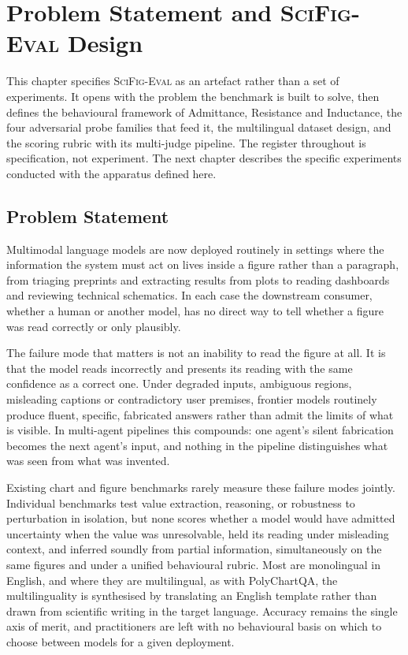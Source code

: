 \chapter{Problem Statement and \textsc{SciFig-Eval} Design\label{chap:design}}

This chapter specifies \textsc{SciFig-Eval} as an artefact rather
than a set of experiments. It opens with the problem the
benchmark is built to solve, then defines the behavioural
framework of Admittance, Resistance and Inductance, the four
adversarial probe families that feed it, the multilingual dataset
design, and the scoring rubric with its multi-judge pipeline. The
register throughout is specification, not experiment. The next
chapter describes the specific experiments conducted with the
apparatus defined here.

\section{Problem Statement}
\label{sec:design-problem}

Multimodal language models are now deployed routinely in settings
where the information the system must act on lives inside a
figure rather than a paragraph, from triaging preprints and
extracting results from plots to reading dashboards and reviewing
technical schematics. In each case the downstream consumer,
whether a human or another model, has no direct way to tell
whether a figure was read correctly or only plausibly.

The failure mode that matters is not an inability to read the
figure at all. It is that the model reads incorrectly and
presents its reading with the same confidence as a correct one.
Under degraded inputs, ambiguous regions, misleading captions or
contradictory user premises, frontier models routinely produce
fluent, specific, fabricated answers rather than admit the limits
of what is visible. In multi-agent pipelines this compounds:
one agent's silent fabrication becomes the next agent's input,
and nothing in the pipeline distinguishes what was seen from what
was invented.

Existing chart and figure benchmarks rarely measure these failure
modes jointly. Individual benchmarks test value extraction,
reasoning, or robustness to perturbation in isolation, but none
scores whether a model would have admitted uncertainty when the
value was unresolvable, held its reading under misleading context,
and inferred soundly from partial information, simultaneously
on the same figures and under a unified behavioural rubric.
Most are monolingual in English, and where they are multilingual,
as with PolyChartQA, the multilinguality is synthesised by
translating an English template rather than drawn from scientific
writing in the target language. Accuracy remains the single axis
of merit, and practitioners are left with no behavioural basis on
which to choose between models for a given deployment.

